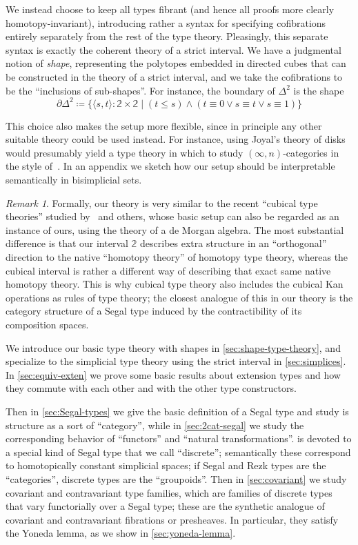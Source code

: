\documentclass{amsart}
\theoremstyle{plain}
\theoremstyle{definition}
\theoremstyle{remark}
\newtheorem{rmk}[thm]{Remark}
\numberwithin{equation}{section}
\newcommand{\jdeq}{\equiv}
\newcommand{\defeq}{\coloneqq}
\newcommand{\sh}[2]{\{#1\mid #2\}}
\newcommand{\pair}[1]{\langle #1\rangle}
\newcommand{\two}{\mathbb{2}}
\begin{document}
We instead choose to keep all types fibrant (and hence all proofs more clearly homotopy-invariant), introducing rather a syntax for specifying cofibrations entirely separately from the rest of the type theory.
Pleasingly, this separate syntax is exactly the coherent theory of a strict interval.
We have a judgmental notion of \emph{shape}, representing the polytopes embedded in directed cubes that can be constructed in the theory of a strict interval, and we take the cofibrations to be the ``inclusions of sub-shapes''.
For instance, the boundary of $\Delta^2$ is the shape
\[ \partial\Delta^2 \defeq \sh{\pair{s,t}:\two\times\two}{(t\le s) \land (t\jdeq 0 \lor s\jdeq t \lor s\jdeq 1)} \]

This choice also makes the setup more flexible, since in principle any other suitable theory could be used instead.
For instance, using Joyal's theory of disks~\cite{disks} would presumably yield a type theory in which to study $(\infty,n)$-categories in the style of~\cite{rezk-theta}.
In an appendix we sketch how our setup should be interpretable semantically in bisimplicial sets.

\begin{rmk}
  Formally, our theory is very similar to the recent ``cubical type theories'' studied by~\cite{CCHM} and others, whose basic setup can also be regarded as an instance of ours, using the theory of a de Morgan algebra.
  The most substantial difference is that our interval $\two$ describes extra structure in an ``orthogonal'' direction to the native ``homotopy theory'' of homotopy type theory, whereas the cubical interval is rather a different way of describing that exact same native homotopy theory.
  This is why cubical type theory also includes the cubical Kan operations as rules of type theory; the closest analogue of this in our theory is the category structure of a Segal type induced by the contractibility of its composition spaces.
\end{rmk}

We introduce our basic type theory with shapes in \cref{sec:shape-type-theory}, and specialize to the simplicial type theory using the strict interval in \cref{sec:simplices}.
In \cref{sec:equiv-exten} we prove some basic results about extension types and how they commute with each other and with the other type constructors.

Then in \cref{sec:Segal-types} we give the basic definition of a Segal type and study is structure as a sort of ``category'', while in \cref{sec:2cat-segal} we study the corresponding behavior of ``functors'' and ``natural transformations''.
 is devoted to a special kind of Segal type that we call ``discrete''; semantically these correspond to homotopically constant simplicial spaces; if Segal and Rezk types are the ``categories'', discrete types are the ``groupoids''.
Then in \cref{sec:covariant} we study covariant and contravariant type families, which are families of discrete types that vary functorially over a Segal type; these are the synthetic analogue of covariant and contravariant fibrations or presheaves.
In particular, they satisfy the Yoneda lemma, as we show in \cref{sec:yoneda-lemma}.
\end{document}
